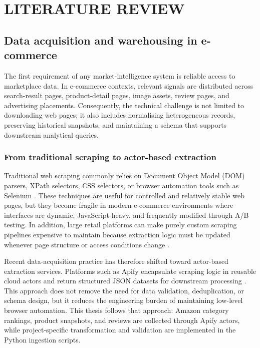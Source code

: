 \chapter{LITERATURE REVIEW}
\label{chap:literature_review}

\section{Data acquisition and warehousing in e-commerce}

The first requirement of any market-intelligence system is reliable
access to marketplace data. In e-commerce contexts, relevant signals are
distributed across search-result pages, product-detail pages, image
assets, review pages, and advertising placements. Consequently, the
technical challenge is not limited to downloading web pages; it also
includes normalising heterogeneous records, preserving historical
snapshots, and maintaining a schema that supports downstream analytical
queries.

\subsection{From traditional scraping to actor-based extraction}

Traditional web scraping commonly relies on Document Object Model (DOM)
parsers, XPath selectors, CSS selectors, or browser automation tools
such as Selenium \citep{mitchell2018webscraping, kouzis2016scrapy}.
These techniques are useful for controlled and relatively stable web
pages, but they become fragile in modern e-commerce environments where
interfaces are dynamic, JavaScript-heavy, and frequently modified
through A/B testing. In addition, large retail platforms can make purely
custom scraping pipelines expensive to maintain because extraction logic
must be updated whenever page structure or access conditions change
\citep{mitchell2018webscraping, apify2024platform}.

Recent data-acquisition practice has therefore shifted toward
actor-based extraction services. Platforms such as Apify encapsulate
scraping logic in reusable cloud actors and return structured JSON
datasets for downstream processing \citep{apify2024platform}. This
approach does not remove the need for data validation, deduplication, or
schema design, but it reduces the engineering burden of maintaining
low-level browser automation. This thesis follows that approach: Amazon
category rankings, product snapshots, and reviews are collected through
Apify actors, while project-specific transformation and validation are
implemented in the Python ingestion scripts.

